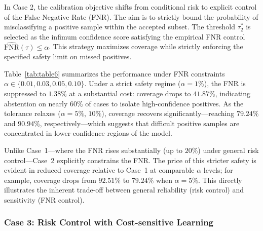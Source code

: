 \documentclass[journal,twoside,web]{ieeecolor}
\begin{document}
In Case 2, the calibration objective shifts from conditional risk to explicit control of the False Negative Rate (FNR). The aim is to strictly bound the probability of misclassifying a positive sample within the accepted subset. The threshold $\tau_2^*$ is selected as the infimum confidence score satisfying the empirical FNR control $\widehat{\mathrm{FNR}}(\tau) \le \alpha$. This strategy maximizes coverage while strictly enforcing the specified safety limit on missed positives.

\begin{table}[htbp]
    \centering
    \caption{The selective classification performance of Case 2.}
    \label{tab:table6}
\end{table}

Table~\ref{tab:table6} summarizes the performance under FNR constraints $\alpha \in \{0.01, 0.03, 0.05, 0.10\}$. Under a strict safety regime ($\alpha=1\%$), the FNR is suppressed to $1.38\%$ at a substantial cost: coverage drops to $41.87\%$, indicating abstention on nearly $60\%$ of cases to isolate high-confidence positives. As the tolerance relaxes ($\alpha=5\%$, $10\%$), coverage recovers significantly—reaching $79.24\%$ and $90.94\%$, respectively—which suggests that difficult positive samples are concentrated in lower-confidence regions of the model.

Unlike Case~1—where the FNR rises substantially (up to $20\%$) under general risk control—Case~2 explicitly constrains the FNR. The price of this stricter safety is evident in reduced coverage relative to Case~1 at comparable $\alpha$ levels; for example, coverage drops from $92.51\%$ to $79.24\%$ when $\alpha=5\%$. This directly illustrates the inherent trade-off between general reliability (risk control) and sensitivity (FNR control).

\subsubsection{\textbf{Case 3: Risk Control with Cost-sensitive Learning}}
\label{sec:case3_results}
\end{document}
